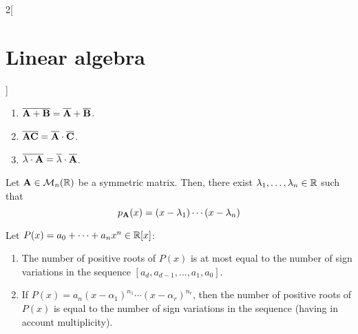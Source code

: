 \documentclass[../../../main.tex]{subfiles}
\begin{document}
\begin{multicols}{2}[\section{Linear algebra}]
\begin{prop}
    \begin{enumerate}
        \item $\overline{\vb{A}+\vb{B}}=\overline{\vb{A}}+\overline{\vb{B}}$.
        \item $\overline{\vb{A}\vb{C}}=\overline{\vb{A}}\cdot\overline{\vb{C}}$.
        \item $\overline{\lambda\cdot\vb{A}}=\overline{\lambda}\cdot\overline{\vb{A}}$.
    \end{enumerate}
\end{prop}
\begin{corollary}
    Let $\vb{A}\in\mathcal{M}_n(\mathbb{R})$ be a symmetric matrix. Then, there exist $\lambda_1,\ldots,\lambda_n\in\mathbb{R}$ such that $$p_{\vb{A}}(x)=(x-\lambda_1 )\cdots(x-\lambda_n)$$
\end{corollary}
\begin{theorem}
    Let $P(x)=a_0+\cdots+a_nx^n\in\mathbb{R}[x]$:
    \begin{enumerate}
        \item The number of positive roots of $P(x)$ is at most equal to the number of sign variations in the sequence $[a_d,a_{d-1},\ldots,a_1,a_0]$.
        \item If $P(x)=a_n(x-\alpha_1)^{n_1}\cdots(x-\alpha_r)^{n_r}$, then the number of positive roots of $P(x)$ is equal to the number of sign variations in the sequence (having in account multiplicity).
\end{enumerate}
\end{theorem}
\end{multicols}
\end{document}
